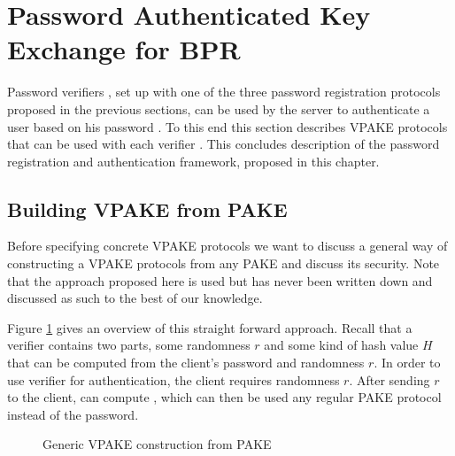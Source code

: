 \section{Password Authenticated Key Exchange for BPR}\label{sec:pake}

Password verifiers \ver, set up with one of the three password registration protocols proposed in the previous sections, can be used by the server to authenticate a user based on his password \pwd.
To this end this section describes \ac{VPAKE} protocols that can be used with each verifier \ver.
This concludes description of the password registration and authentication framework, proposed in this chapter.


\subsection{Building VPAKE from PAKE}
Before specifying concrete \ac{VPAKE} protocols we want to discuss a general way of constructing a \ac{VPAKE} protocols from any \ac{PAKE} and discuss its security.
Note that the approach proposed here is used but has never been written down and discussed as such to the best of our knowledge.

Figure \ref{fig:genericVPAKE} gives an overview of this straight forward approach.
Recall that a verifier \ver contains two parts, some randomness $r$ and some kind of hash value $H$ that can be computed from the client's password \pwd and randomness $r$.
In order to use verifier \ver for authentication, the client requires randomness $r$.
After sending $r$ to the client, \Client can compute \ver, which can then be used any regular \ac{PAKE} protocol instead of the password.

\begin{figure}[htbp]
\centering
{}
\caption{Generic VPAKE construction from PAKE}
\label{fig:genericVPAKE}
\end{figure}

